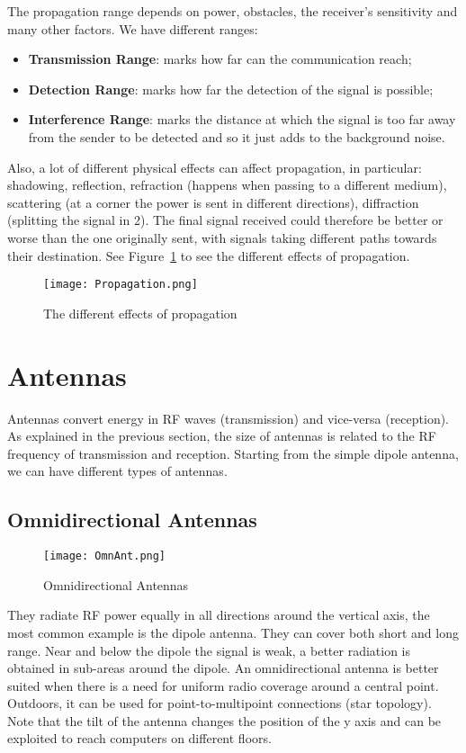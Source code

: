 The propagation range depends on power, obstacles, the receiver's 
sensitivity and many other factors. We have different ranges:
\begin{itemize}
\item \textbf{Transmission Range}: marks how far can the communication 
  reach;
\item \textbf{Detection Range}: marks how far the detection of the signal 
  is possible;
\item \textbf{Interference Range}: marks the distance at which the signal 
  is too far away from the sender to be detected and so it just adds to the 
  background noise.
\end{itemize}
Also, a lot of different physical effects can affect propagation, in 
particular: shadowing, reflection, refraction (happens when passing to a 
different medium), scattering (at a corner the power is sent in different 
directions), diffraction (splitting the signal in 2).
The final signal received could therefore be better or worse than the 
one originally sent, with signals taking different paths towards their 
destination. See Figure~\ref{fig:ewn:Propagation} to see the different effects 
of propagation.

\begin{figure}[h]
  \centering
  \texttt{[image: Propagation.png]}
  \caption{The different effects of propagation}
  \label{fig:ewn:Propagation}
\end{figure}

\section{Antennas}
Antennas convert energy in RF waves (transmission) and vice-versa 
(reception). As explained in the previous section, the size of antennas is 
related to the RF frequency of transmission and reception.
Starting from the simple dipole antenna, we can have different types of 
antennas.

\subsection{Omnidirectional Antennas}
\begin{figure}[t]
  \centering
  \texttt{[image: OmnAnt.png]}
  \caption{Omnidirectional Antennas}				
  \label{fig:ewn:OmnAnt}
\end{figure}
They radiate RF power equally in all directions around the vertical axis, the
most common example is the dipole antenna. They can cover both short and long
range.
Near and below the dipole the signal is weak, a better radiation is 
obtained in sub-areas around the dipole. An omnidirectional antenna is better 
suited when there is a need for uniform radio coverage around a central point. 
Outdoors, it can be used for point-to-multipoint connections (star topology). 
Note that the tilt of the antenna changes the position of the y axis and can be 
exploited to reach computers on different floors.

